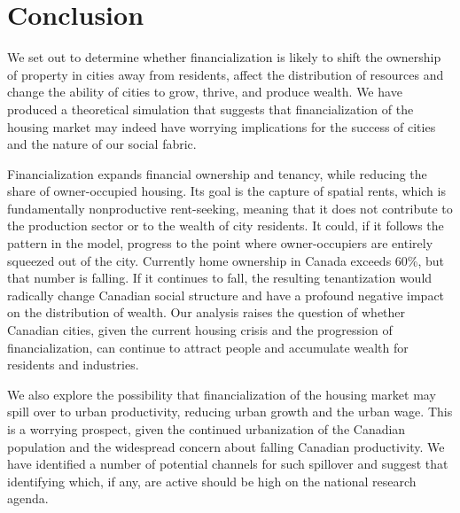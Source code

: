 \chapter{Conclusion} \label{chapter-conclusions}


We set out to determine whether financialization is likely to  shift the ownership of property in cities away from residents, affect the distribution of resources and change the ability of cities to grow, thrive, and produce wealth. 
We have produced a theoretical simulation that suggests that financialization of the housing market may indeed have worrying implications for the success of cities and the nature of our social fabric. 

Financialization expands financial ownership and tenancy, while reducing the share of owner-occupied housing. Its goal is the capture of spatial rents, which is fundamentally nonproductive \gls{rent-seeking}, meaning that it does not contribute to the production sector or to the wealth of city residents. 
It could, if it follows the pattern in the model, progress to the point where owner-occupiers are entirely squeezed out of the city. Currently home ownership in Canada exceeds 60\%, but that number is falling. 
If it continues to fall, the resulting tenantization would radically change Canadian social structure and have a profound negative impact on the distribution of wealth. Our analysis raises the question of whether Canadian cities, given the current housing crisis and the progression of financialization, can continue to attract people and accumulate wealth for residents and industries.

We also explore the possibility that financialization of the housing market may spill over to urban productivity, reducing urban growth and the urban wage. This is a worrying prospect, given the continued urbanization of the Canadian population and the widespread concern about falling Canadian productivity. We have identified a number of potential channels  for such spillover and suggest that identifying which, if any, are active should be high on the national %
research agenda.

